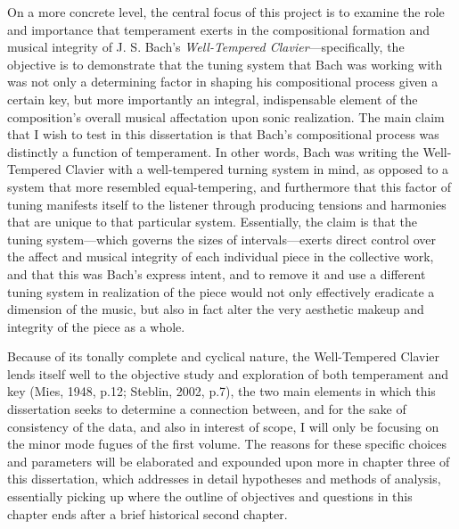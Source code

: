 On a more concrete level, the central focus of this project is to
examine the role and importance that temperament exerts in the
compositional formation and musical integrity of J. S. Bach's
\emph{Well-Tempered Clavier}---specifically, the objective is to
demonstrate that the tuning system that Bach was working with was not
only a determining factor in shaping his compositional process given a
certain key, but more importantly an integral, indispensable element of
the composition's overall musical affectation upon sonic realization.
The main claim that I wish to test in this dissertation is that Bach's
compositional process was distinctly a function of temperament. In other
words, Bach was writing the Well-Tempered Clavier with a well-tempered
turning system in mind, as opposed to a system that more resembled
equal-tempering, and furthermore that this factor of tuning manifests
itself to the listener through producing tensions and harmonies that are
unique to that particular system. Essentially, the claim is that the
tuning system---which governs the sizes of intervals---exerts direct
control over the affect and musical integrity of each individual piece
in the collective work, and that this was Bach's express intent, and to
remove it and use a different tuning system in realization of the piece
would not only effectively eradicate a dimension of the music, but also
in fact alter the very aesthetic makeup and integrity of the piece as a
whole.

Because of its tonally complete and cyclical nature, the Well-Tempered
Clavier lends itself well to the objective study and exploration of both
temperament and key (Mies, 1948, p.12; Steblin, 2002, p.7), the two main
elements in which this dissertation seeks to determine a connection
between, and for the sake of consistency of the data, and also in
interest of scope, I will only be focusing on the minor mode fugues of
the first volume. The reasons for these specific choices and parameters
will be elaborated and expounded upon more in chapter three of this
dissertation, which addresses in detail hypotheses and methods of
analysis, essentially picking up where the outline of objectives and
questions in this chapter ends after a brief historical second chapter.

